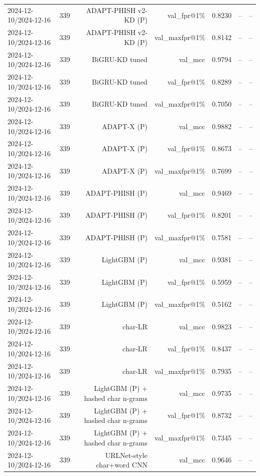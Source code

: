 \begin{table}[t]
\begin{tabular}{llrrrrr}
2024-12-10/2024-12-16 & 339 & ADAPT-PHISH v2-KD (P) & val\_fpr@1\% & 0.8230 & -- & -- \\
2024-12-10/2024-12-16 & 339 & ADAPT-PHISH v2-KD (P) & val\_maxfpr@1\% & 0.8142 & -- & -- \\
2024-12-10/2024-12-16 & 339 & BiGRU-KD tuned & val\_mcc & 0.9794 & -- & -- \\
2024-12-10/2024-12-16 & 339 & BiGRU-KD tuned & val\_fpr@1\% & 0.8289 & -- & -- \\
2024-12-10/2024-12-16 & 339 & BiGRU-KD tuned & val\_maxfpr@1\% & 0.7050 & -- & -- \\
2024-12-10/2024-12-16 & 339 & ADAPT-X (P) & val\_mcc & 0.9882 & -- & -- \\
2024-12-10/2024-12-16 & 339 & ADAPT-X (P) & val\_fpr@1\% & 0.8673 & -- & -- \\
2024-12-10/2024-12-16 & 339 & ADAPT-X (P) & val\_maxfpr@1\% & 0.7699 & -- & -- \\
2024-12-10/2024-12-16 & 339 & ADAPT-PHISH (P) & val\_mcc & 0.9469 & -- & -- \\
2024-12-10/2024-12-16 & 339 & ADAPT-PHISH (P) & val\_fpr@1\% & 0.8201 & -- & -- \\
2024-12-10/2024-12-16 & 339 & ADAPT-PHISH (P) & val\_maxfpr@1\% & 0.7581 & -- & -- \\
2024-12-10/2024-12-16 & 339 & LightGBM (P) & val\_mcc & 0.9381 & -- & -- \\
2024-12-10/2024-12-16 & 339 & LightGBM (P) & val\_fpr@1\% & 0.5959 & -- & -- \\
2024-12-10/2024-12-16 & 339 & LightGBM (P) & val\_maxfpr@1\% & 0.5162 & -- & -- \\
2024-12-10/2024-12-16 & 339 & char-LR & val\_mcc & 0.9823 & -- & -- \\
2024-12-10/2024-12-16 & 339 & char-LR & val\_fpr@1\% & 0.8437 & -- & -- \\
2024-12-10/2024-12-16 & 339 & char-LR & val\_maxfpr@1\% & 0.7935 & -- & -- \\
2024-12-10/2024-12-16 & 339 & LightGBM (P) + hashed char n-grams & val\_mcc & 0.9735 & -- & -- \\
2024-12-10/2024-12-16 & 339 & LightGBM (P) + hashed char n-grams & val\_fpr@1\% & 0.8732 & -- & -- \\
2024-12-10/2024-12-16 & 339 & LightGBM (P) + hashed char n-grams & val\_maxfpr@1\% & 0.7345 & -- & -- \\
2024-12-10/2024-12-16 & 339 & URLNet-style char+word CNN & val\_mcc & 0.9646 & -- & -- \\

\end{tabular}
\end{table}
